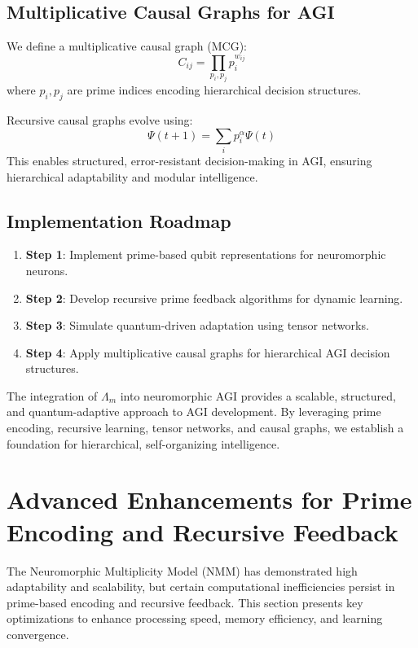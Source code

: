 \documentclass{article}
\theoremstyle{plain}
\begin{document}
\subsection{Multiplicative Causal Graphs for AGI}
We define a multiplicative causal graph (MCG):
\begin{equation}
C_{ij} = \prod_{p_i, p_j} p_i^{w_{ij}}
\end{equation}
where $p_i, p_j$ are prime indices encoding hierarchical decision structures.

Recursive causal graphs evolve using:
\begin{equation}
\Psi(t+1) = \sum_i p_i^\alpha \Psi(t)
\end{equation}
This enables structured, error-resistant decision-making in AGI, ensuring hierarchical adaptability and modular intelligence.

\subsection{Implementation Roadmap}
\begin{enumerate}
    \item \textbf{Step 1}: Implement prime-based qubit representations for neuromorphic neurons.
    \item \textbf{Step 2}: Develop recursive prime feedback algorithms for dynamic learning.
    \item \textbf{Step 3}: Simulate quantum-driven adaptation using tensor networks.
    \item \textbf{Step 4}: Apply multiplicative causal graphs for hierarchical AGI decision structures.
\end{enumerate}

The integration of $\Lambda_m$ into neuromorphic AGI provides a scalable, structured, and quantum-adaptive approach to AGI development. By leveraging prime encoding, recursive learning, tensor networks, and causal graphs, we establish a foundation for hierarchical, self-organizing intelligence.




\section{Advanced Enhancements for Prime Encoding and Recursive Feedback}

The Neuromorphic Multiplicity Model (NMM) has demonstrated high adaptability and scalability, but certain computational inefficiencies persist in prime-based encoding and recursive feedback. This section presents key optimizations to enhance processing speed, memory efficiency, and learning convergence.
\end{document}
